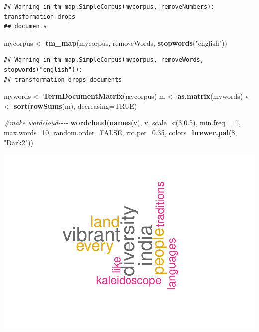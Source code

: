 \documentclass[
]{book}
\newenvironment{Shaded}{\begin{snugshade}}{\end{snugshade}}
\newcommand{\AttributeTok}[1]{\textcolor[rgb]{0.13,0.29,0.53}{#1}}
\newcommand{\CommentTok}[1]{\textcolor[rgb]{0.56,0.35,0.01}{\textit{#1}}}
\newcommand{\ConstantTok}[1]{\textcolor[rgb]{0.56,0.35,0.01}{#1}}
\newcommand{\DecValTok}[1]{\textcolor[rgb]{0.00,0.00,0.81}{#1}}
\newcommand{\FloatTok}[1]{\textcolor[rgb]{0.00,0.00,0.81}{#1}}
\newcommand{\FunctionTok}[1]{\textcolor[rgb]{0.13,0.29,0.53}{\textbf{#1}}}
\newcommand{\NormalTok}[1]{#1}
\newcommand{\OtherTok}[1]{\textcolor[rgb]{0.56,0.35,0.01}{#1}}
\newcommand{\StringTok}[1]{\textcolor[rgb]{0.31,0.60,0.02}{#1}}
\begin{document}
\begin{verbatim}
## Warning in tm_map.SimpleCorpus(mycorpus, removeNumbers): transformation drops
## documents
\end{verbatim}

\begin{Shaded}
\begin{Highlighting}[]
\NormalTok{mycorpus }\OtherTok{\textless{}{-}} \FunctionTok{tm\_map}\NormalTok{(mycorpus, removeWords, }\FunctionTok{stopwords}\NormalTok{(}\StringTok{"english"}\NormalTok{))}
\end{Highlighting}
\end{Shaded}

\begin{verbatim}
## Warning in tm_map.SimpleCorpus(mycorpus, removeWords, stopwords("english")):
## transformation drops documents
\end{verbatim}

\begin{Shaded}
\begin{Highlighting}[]
\NormalTok{mywords }\OtherTok{\textless{}{-}} \FunctionTok{TermDocumentMatrix}\NormalTok{(mycorpus)}
\NormalTok{m }\OtherTok{\textless{}{-}} \FunctionTok{as.matrix}\NormalTok{(mywords)}
\NormalTok{v }\OtherTok{\textless{}{-}} \FunctionTok{sort}\NormalTok{(}\FunctionTok{rowSums}\NormalTok{(m), }\AttributeTok{decreasing=}\ConstantTok{TRUE}\NormalTok{)}

\CommentTok{\#make wordcloud{-}{-}{-}{-}}
\FunctionTok{wordcloud}\NormalTok{(}\FunctionTok{names}\NormalTok{(v), v, }\AttributeTok{scale=}\FunctionTok{c}\NormalTok{(}\DecValTok{3}\NormalTok{,}\FloatTok{0.5}\NormalTok{), }\AttributeTok{min.freq =} \DecValTok{1}\NormalTok{,}
          \AttributeTok{max.words=}\DecValTok{10}\NormalTok{, }\AttributeTok{random.order=}\ConstantTok{FALSE}\NormalTok{, }\AttributeTok{rot.per=}\FloatTok{0.35}\NormalTok{, }
          \AttributeTok{colors=}\FunctionTok{brewer.pal}\NormalTok{(}\DecValTok{8}\NormalTok{, }\StringTok{"Dark2"}\NormalTok{))}
\end{Highlighting}
\end{Shaded}

\includegraphics{_main_files/figure-latex/unnamed-chunk-62-1.pdf}
\end{document}
